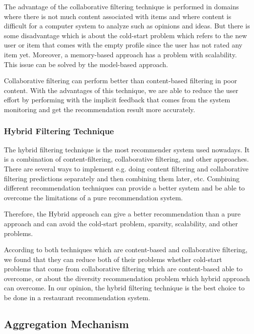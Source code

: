 \documentclass[12pt,oneside,openright,a4paper]{cpe-english-project}
\begin{document}
The advantage of the collaborative filtering technique is performed in domains where there is not much content associated with items and where content is difficult for a computer system to analyze such as opinions and ideas. \cite{Recommendersystem} But there is some disadvantage which is about the cold-start problem which refers to the new user or item that comes with the empty profile since the user has not rated any item yet. Moreover, a memory-based approach has a problem with scalability. This issue can be solved by the model-based approach.

Collaborative filtering can perform better than content-based filtering in poor content. With the advantages of this technique, we are able to reduce the user effort by performing with the implicit feedback that comes from the system monitoring and get the recommendation result more accurately.


\subsubsection{Hybrid Filtering Technique}

The hybrid filtering technique is the most recommender system used nowadays. It is a combination of content-filtering, collaborative filtering, and other approaches. There are several ways to implement e.g. doing content filtering and collaborative filtering predictions separately and then combining them later, etc. Combining different recommendation techniques can provide a better system and be able to overcome the limitations of a pure recommendation system.

Therefore, the Hybrid approach can give a better recommendation than a pure approach and can avoid the cold-start problem, sparsity, scalability, and other problems.

According to both techniques which are content-based and collaborative filtering, we found that they can reduce both of their problems whether cold-start problems that come from collaborative filtering which are content-based able to overcome, or about the diversity recommendation problem which hybrid approach can overcome. In our opinion, the hybrid filtering technique is the best choice to be done in a restaurant recommendation system.
        
        

\subsection{Aggregation Mechanism}
\end{document}
